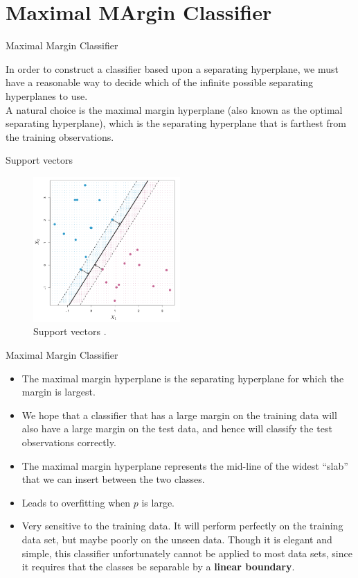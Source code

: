 \documentclass{beamer}
\begin{document}
\section{Maximal MArgin Classifier}

\begin{frame}{Maximal Margin Classifier}

  In order to construct a classifier based upon a separating hyperplane, we must have a reasonable way to decide which of the infinite possible separating hyperplanes to use.
  \\[10pt]
  A natural choice is the maximal margin hyperplane (also known as the optimal separating hyperplane), which is the separating hyperplane that is farthest from the training observations.\cite{sohil_introduction_2022}
\end{frame}


\begin{frame}{Support vectors}
  \begin{figure}
    \includegraphics[width=0.5\textwidth]{supportvectors}
    \caption{Support vectors \cite{sohil_introduction_2022}.}
  \end{figure}
\end{frame}

\begin{frame}{Maximal Margin Classifier}
  \begin{itemize}
  \item The maximal margin hyperplane is the separating hyperplane for which the margin is largest.
  \item We hope that a classifier that has a large margin on the training data will also have a large margin on the test data, and hence will classify the test observations correctly. 
  \item The maximal margin hyperplane represents the mid-line of the widest “slab” that we can insert between the two classes.
  \item Leads to overfitting when $p$ is large. 
  \item Very sensitive to the training data. It will perform perfectly on the training data set, but maybe poorly on the unseen data. 
  Though it is elegant and simple, this classifier unfortunately cannot be applied to most data sets, since it requires that the classes be separable by a {\bf linear boundary}. 
  \end{itemize}
\end{frame}
\end{document}

